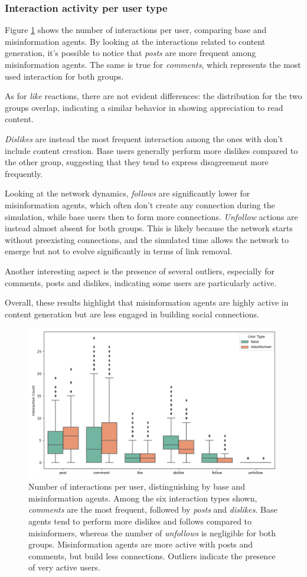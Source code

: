 \subsubsection{Interaction activity per user type}
Figure \ref{fig:interactions_count} shows the number of interactions per user, comparing base and misinformation agents.
By looking at the interactions related to content generation, it's possible to notice that \textit{posts} are more frequent among misinformation agents.
The same is true for \textit{comments}, which represents the most used interaction for both groups.

As for \textit{like} reactions, there are not evident differences: the distribution for the two groups overlap, indicating a similar behavior in showing appreciation to read content.

\textit{Dislikes} are instead the most frequent interaction among the ones with don't include content creation.
Base users generally perform more dislikes compared to the other group, suggesting that they tend to express disagreement more frequently.

Looking at the network dynamics, \textit{follows} are significantly lower for misinformation agents, which often don't create any connection during the simulation, while base users then to form more connections.
\textit{Unfollow} actions are instead almost absent for both groups. This is likely because the network starts without preexisting connections, and the simulated time allows the network to emerge but not to evolve significantly in terms of link removal.

Another interesting aspect is the presence of several outliers, especially for comments, posts and dislikes, indicating some users are particularly active.

Overall, these results highlight that misinformation agents are highly active in content generation but are less engaged in building social connections.


\begin{figure}[h]
    \centering
    \includegraphics[width=0.6\linewidth]{Images/Interactions/count_per_user_DefaultRecSys.png}
    \caption{Number of interactions per user, distinguishing by base and misinformation agents.
    Among the six interaction types shown, \textit{comments} are the most frequent, followed by \textit{posts} and \textit{dislikes}.
    Base agents tend to perform more dislikes and follows compared to misinformers, whereas the number of \textit{unfollows} is negligible for both groups.
    Misinformation agents are more active with posts and comments, but build less connections.
    Outliers indicate the presence of very active users.
    }
    \label{fig:interactions_count}
\end{figure}


